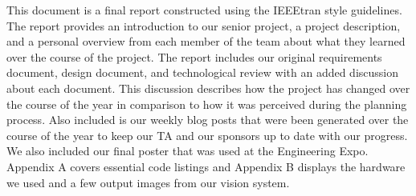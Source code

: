 This document is a final report constructed using the IEEEtran style guidelines. The report provides an introduction to our senior project, a project description, and a personal overview from each member of the team about what they learned over the course of the project. The report includes our original requirements document, design document, and technological review with an added discussion about each document. This discussion describes how the project has changed over the course of the year in comparison to how it was perceived during the planning process. Also included is our weekly blog posts that were been generated over the course of the year to keep our TA and our sponsors up to date with our progress. We also included our final poster that was used at the Engineering Expo. Appendix A covers essential code listings and Appendix B displays the hardware we used and a few output images from our vision system. 
